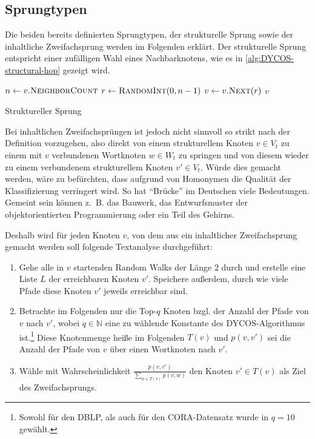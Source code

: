 \subsection{Sprungtypen}\label{sec:sprungtypen}
Die beiden bereits definierten Sprungtypen, der strukturelle Sprung sowie der
inhaltliche Zweifachsprung werden im Folgenden erklärt.
\goodbreak
Der strukturelle Sprung entspricht einer zufälligen Wahl eines Nachbarknotens,
wie es in \cref{alg:DYCOS-structural-hop} gezeigt wird.
\begin{algorithm}[H]
    \begin{algorithmic}[1]
            \State $n \gets v.\Call{NeighborCount}{}$ 
            \State $r \gets \Call{RandomInt}{0, n-1}$ 
            \State $v \gets v.\Call{Next}{r}$ 
            \State \Return $v$
        \EndProcedure
    \end{algorithmic}
\caption{Struktureller Sprung}
\label{alg:DYCOS-structural-hop}
\end{algorithm}

Bei inhaltlichen Zweifachsprüngen ist jedoch nicht sinnvoll so strikt nach der
Definition vorzugehen,  also direkt von einem strukturellem Knoten $v \in V_t$
zu einem mit $v$ verbundenen Wortknoten $w \in W_t$ zu springen und von diesem
wieder zu einem verbundenem strukturellem Knoten $v' \in V_t$. Würde dies
gemacht werden, wäre zu befürchten, dass aufgrund von Homonymen die Qualität der
Klassifizierung verringert wird. So hat \enquote{Brücke} im Deutschen viele
Bedeutungen. Gemeint sein können z.~B. das Bauwerk, das Entwurfsmuster der
objektorientierten Programmierung oder ein Teil des Gehirns.

Deshalb wird für jeden Knoten $v$, von dem aus ein inhaltlicher
Zweifachsprung gemacht werden soll folgende Textanalyse durchgeführt:
\begin{enumerate}[label=C\arabic*,ref=C\arabic*]
    \item \label{step:c1} Gehe alle in $v$ startenden Random Walks der Länge $2$ durch
          und erstelle eine Liste $L$ der erreichbaren Knoten $v'$. Speichere
          außerdem, durch wie viele Pfade diese Knoten $v'$ jeweils erreichbar
          sind.
    \item \label{step:c2} Betrachte im Folgenden nur die Top-$q$ Knoten bzgl.
          der Anzahl der Pfade von $v$ nach $v'$, wobei $q \in \mathbb{N}$
          eine zu wählende Konstante des DYCOS-Algorithmus ist.\footnote{Sowohl für den DBLP, als auch für den
CORA-Datensatz wurde in \cite[S. 364]{aggarwal2011} $q=10$ gewählt.}
          Diese Knotenmenge heiße im Folgenden $T(v)$ und $p(v, v')$ sei die
          Anzahl der Pfade von $v$ über einen Wortknoten nach $v'$.
    \item \label{step:c3} Wähle mit Wahrscheinlichkeit
          $\frac{p(v, v')}{\sum_{w \in T(v)} p(v, w)}$ den Knoten $v' \in T(v)$
          als Ziel des Zweifachsprungs.
\end{enumerate}


